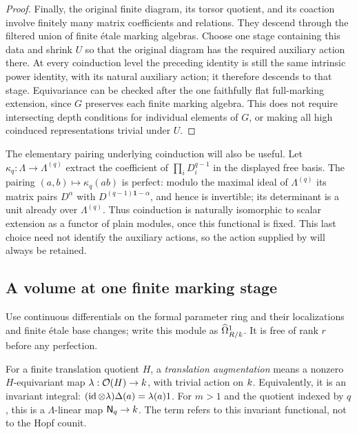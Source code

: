 \begin{proof}
Finally, the original finite diagram, its torsor quotient, and its
coaction involve finitely many matrix coefficients and relations.
They descend through the filtered union of finite \'{e}tale marking
algebras.  Choose one stage containing this data and shrink $U$ so that
the original diagram has the required auxiliary action there.  At
every coinduction level the preceding identity is still the same
intrinsic power identity, with its natural auxiliary action; it
therefore descends to that stage.  Equivariance can be checked after
the one faithfully flat full-marking extension, since $G$ preserves
each finite marking algebra.  This does not require intersecting
depth conditions for individual elements of $G$, or making all high
coinduced representations trivial under $U$.
\end{proof}

The elementary pairing underlying coinduction will also be useful.
Let $\kappa_q:\Lambda\to\Lambda^{(q)}$ extract the coefficient of
$\prod_iD_i^{q-1}$ in the displayed free basis.  The pairing
$(a,b)\mapsto\kappa_q(ab)$ is perfect: modulo the maximal ideal of
$\Lambda^{(q)}$ its matrix pairs $D^\alpha$ with
$D^{(q-1)\mathbf1-\alpha}$, and hence is invertible; its determinant
is a unit already over $\Lambda^{(q)}$.  Thus coinduction is naturally
isomorphic to scalar extension as a functor of plain modules, once
this functional is fixed.  This last choice need not identify the
auxiliary actions, so the action supplied by
 will always be retained.

\subsection{A volume at one finite marking stage}

Use continuous differentials on the formal parameter ring and their
localizations and finite \'{e}tale base changes; write this module as
$\widehat\Omega^1_{R/k}$.  It is free of rank $r$ before any perfection.

For a finite translation quotient $H$, a \emph{translation augmentation}
means a nonzero $H$-equivariant map $\lambda:\mathcal O(H)\to k$, with trivial
action on $k$. Equivalently, it is an invariant integral:
$(\operatorname{id}\otimes\lambda)\Delta(a)=\lambda(a)1$.
For $m>1$ and the quotient indexed by $q$, this is a $\Lambda$-linear
map $\mathsf N_q\to k$. The term refers to this invariant functional,
not to the Hopf counit.

